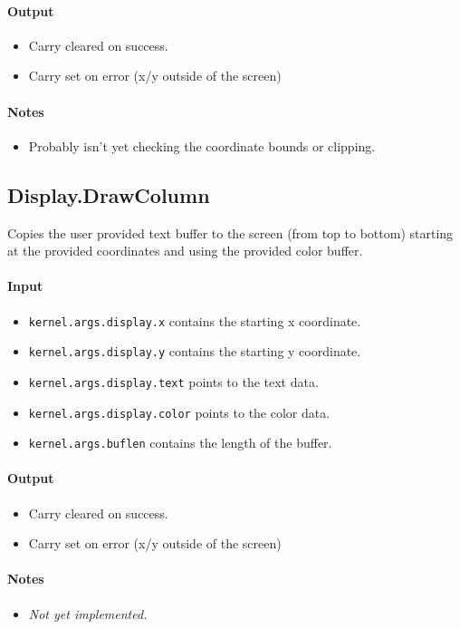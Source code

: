 \paragraph{Output}

\begin{itemize}
\item Carry cleared on success.
\item Carry set on error (x/y outside of the screen)
\end{itemize}

\paragraph{Notes}

\begin{itemize}
\item Probably isn't yet checking the coordinate bounds or clipping.
\end{itemize}

\subsection*{Display.DrawColumn}
Copies the user provided text buffer to the screen (from top to bottom) starting at the provided coordinates and using the provided color buffer.

\paragraph{Input}

\begin{itemize}
\item \verb+kernel.args.display.x+ contains the starting x coordinate.
\item \verb+kernel.args.display.y+ contains the starting y coordinate.
\item \verb+kernel.args.display.text+ points to the text data.
\item \verb+kernel.args.display.color+ points to the color data.
\item \verb+kernel.args.buflen+ contains the length of the buffer.
\end{itemize}

\paragraph{Output}

\begin{itemize}
\item Carry cleared on success.
\item Carry set on error (x/y outside of the screen)
\end{itemize}

\paragraph{Notes}

\begin{itemize}
\item {\em Not yet implemented.}
\end{itemize}
